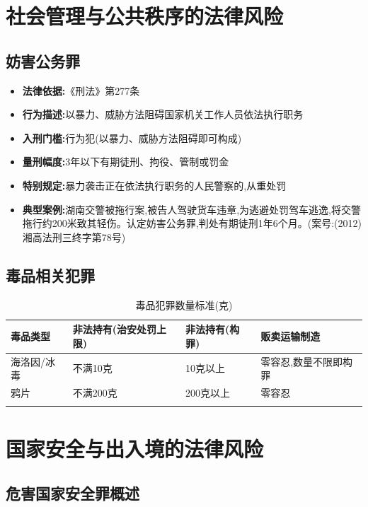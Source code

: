 \documentclass[12pt,a4paper]{article}
\begin{document}
\clearpage

\section{社会管理与公共秩序的法律风险}

\subsection{妨害公务罪}

\begin{itemize}
  \item \textbf{法律依据:}《刑法》第277条
  \item \textbf{行为描述:}以暴力、威胁方法阻碍国家机关工作人员依法执行职务
  \item \textbf{入刑门槛:}行为犯(以暴力、威胁方法阻碍即可构成)
  \item \textbf{量刑幅度:}3年以下有期徒刑、拘役、管制或罚金
  \item \textbf{特别规定:}暴力袭击正在依法执行职务的人民警察的,从重处罚
  \item \textbf{典型案例:}湖南交警被拖行案,被告人驾驶货车违章,为逃避处罚驾车逃逸,将交警拖行约200米致其轻伤。认定妨害公务罪,判处有期徒刑1年6个月。(案号:(2012)湘高法刑三终字第78号)
\end{itemize}

\subsection{毒品相关犯罪}

\begin{longtable}{p{3cm}p{4cm}p{3cm}p{3cm}}
  \toprule
  \textbf{毒品类型} & \textbf{非法持有(治安处罚上限)} & \textbf{非法持有(构罪)} & \textbf{贩卖运输制造} \\
  \midrule
  海洛因/冰毒 & 不满10克 & 10克以上 & 零容忍,数量不限即构罪 \\
  鸦片 & 不满200克 & 200克以上 & 零容忍 \\
  \bottomrule
  \caption{毒品犯罪数量标准(克)}
\end{longtable}

\clearpage

\section{国家安全与出入境的法律风险}

\subsection{危害国家安全罪概述}
\end{document}
